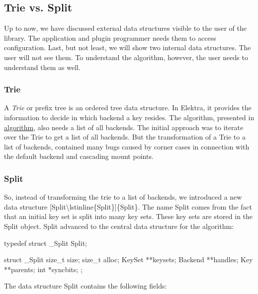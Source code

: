 \subsection*{Trie vs. Split}

Up to now, we have discussed external data structures visible to the user of the library. The application and plugin programmer needs them to access configuration. Last, but not least, we will show two internal data structures. The user will not see them. To understand the algorithm, however, the user needs to understand them as well.

\subsubsection*{Trie}

A {\itshape Trie} or prefix tree is an ordered tree data structure. In Elektra, it provides the information to decide in which backend a key resides. The algorithm, presented in \hyperlink{md_doc_help_elektra-algorithm_doc_help_elektra-algorithm_md}{algorithm}, also needs a list of all backends. The initial approach was to iterate over the {\ttfamily Trie} to get a list of all backends. But the transformation of a {\ttfamily Trie} to a list of backends, contained many bugs caused by corner cases in connection with the default backend and cascading mount points.

\subsubsection*{Split}

So, instead of transforming the trie to a list of backends, we introduced a new data structure \mbox{[}Split\textbackslash{}lstinline\{Split\}\mbox{]}\{Split\}. The name {\ttfamily Split} comes from the fact that an initial key set is split into many key sets. These key sets are stored in the {\ttfamily Split} object. {\ttfamily Split} advanced to the central data structure for the algorithm\+: \begin{DoxyVerb}    typedef struct _Split   Split;

    struct _Split {
            size_t size;
            size_t alloc;
            KeySet **keysets;
            Backend **handles;
            Key **parents;
            int *syncbits;
    };
\end{DoxyVerb}


The data structure {\ttfamily Split} contains the following fields\+:


